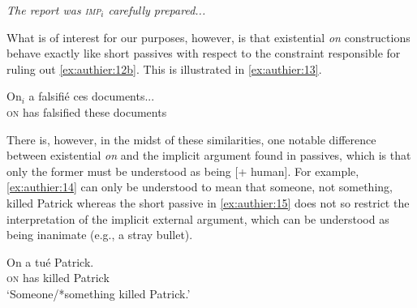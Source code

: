 \documentclass[output=paper,colorlinks,citecolor=brown]{langscibook}
\begin{document}
\begin{exe}
 \ex\label{ex:authier:12} 
\textit{The report was \textsc{imp}$_{i}$ carefully prepared...}
 \begin{xlist}
    \end{xlist}
\end{exe}


What is of interest for our purposes, however, is that existential \textit{on} constructions behave exactly like short passives with respect to the constraint responsible for ruling out \ref{ex:authier:12b}. This is illustrated in \ref{ex:authier:13}.


\begin{exe}
\ex\label{ex:authier:13} 
 \gll On$_{i}$ a falsifié ces documents... \\
    \textsc{on} has falsified these documents\\
 \begin{xlist}
\end{xlist}
\end{exe}


There is, however, in the midst of these similarities, one notable difference between existential \textit{on} and the implicit argument found in passives, which is that only the former must be understood as being [+ human]. For example, \ref{ex:authier:14} can only be understood to mean that someone, not something, killed Patrick whereas the short passive in \ref{ex:authier:15} does not so restrict the interpretation of the implicit external argument, which can be understood as being inanimate (e.g., a stray bullet).

\begin{exe}
\ex\label{ex:authier:14} 
\gll On a tué Patrick.\\
\textsc{on} has killed Patrick\\ 
\glt `Someone/*something killed Patrick.'
\end{exe}
\end{document}
